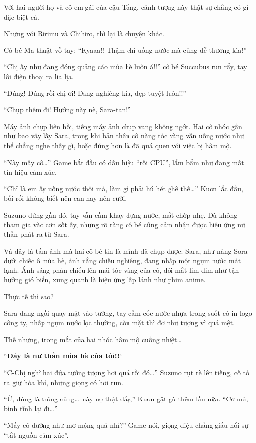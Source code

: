 \documentclass[../main.tex]{subfiles}
\begin{document}
Với hai người họ và cô em gái của cậu Tổng, cảnh tượng này thật sự chẳng có gì đặc biệt cả.

Nhưng với Ririmu và Chihiro, thì lại là chuyện khác.

Cô bé Ma thuật vỗ tay: ``Kyaaa!! Thậm chí uống nước mà cũng dễ thương kìa!''

``Chị ấy như đang đóng quảng cáo mùa hè luôn á!!'' cô bé Succubus run rẩy, tay lôi điện thoại ra lia lịa.

``Đúng! Đúng rồi chị ơi! Dáng nghiêng kìa, đẹp tuyệt luôn!!''

``Chụp thêm đi! Hướng này nè, Sara-tan!''

Máy ảnh chụp liên hồi, tiếng máy ảnh chụp vang không ngớt. Hai cô nhóc gần như bao vây lấy Sara, trong khi bản thân cô nàng tóc vàng vẫn uống nước như thể chẳng nghe thấy gì, hoặc đúng hơn là đã quá quen với việc bị hâm mộ.

``Này mấy cô\dots''  Game bắt đầu có dấu hiệu ``rối CPU'', lẩm bẩm như đang mất tín hiệu cảm xúc.

``Chỉ là em ấy uống nước thôi mà, làm gì phải hú hét ghê thế\dots'' Kuon lắc đầu, bối rối không biết nên can hay nên cười.

Suzuno đứng gần đó, tay vẫn cầm khay đựng nước, mắt chớp nhẹ. Dù không tham gia vào cơn sốt ấy, nhưng rõ ràng cô bé cũng cảm nhận được hiệu ứng nữ thần phát ra từ Sara.

Và đây là tấm ảnh mà hai cô bé tin là mình đã chụp được: Sara, như nàng Sora dưới chiếc ô mùa hè, ánh nắng chiếu nghiêng, đang nhấp một ngụm nước mát lạnh. Ánh sáng phản chiếu lên mái tóc vàng của cô, đôi mắt lim dim như tận hưởng gió biển, xung quanh là hiệu ứng lấp lánh như phim anime.


Thực tế thì sao?

Sara đang ngồi quay mặt vào tường, tay cầm cốc nước nhựa trong suốt có in logo công ty, nhấp ngụm nước lọc thường, còn mặt thì đơ như tượng vì quá mệt.

Thế nhưng, trong mắt của hai nhóc hâm mộ cuồng nhiệt\dots

``\textbf{Đây là nữ thần mùa hè của tôi!!}''

``C-Chị nghĩ hai đứa tưởng tượng hơi quá rồi đó\dots'' Suzuno rụt rè lên tiếng, cố tỏ ra giữ hòa khí, nhưng giọng có hơi run.

``Ừ, đúng là trông cũng\dots\ này nọ thật đấy,'' Kuon gật gù thêm lần nữa. ``Cơ mà, bình tĩnh lại đi\dots''

``Mấy cô dường như mơ mộng quá nhỉ?'' Game nói, giọng điệu chẳng giấu nổi sự ``tắt nguồn cảm xúc''.
\end{document}
